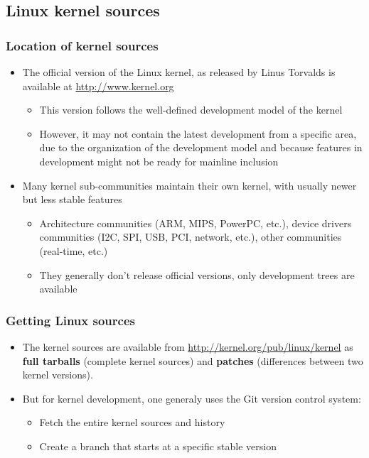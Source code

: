 \subsection{Linux kernel sources}

\begin{frame}
  \frametitle{Location of kernel sources}
  \begin{itemize}
  \item The official version of the Linux kernel, as released by Linus
    Torvalds is available at \url{http://www.kernel.org}
    \begin{itemize}
    \item This version follows the well-defined development model of
      the kernel
    \item However, it may not contain the latest development from a
      specific area, due to the organization of the development model
      and because features in development might not be ready for
      mainline inclusion
    \end{itemize}
  \item Many kernel sub-communities maintain their own kernel, with
    usually newer but less stable features
    \begin{itemize}
    \item Architecture communities (ARM, MIPS, PowerPC, etc.), device
      drivers communities (I2C, SPI, USB, PCI, network, etc.), other
      communities (real-time, etc.)
    \item They generally don't release official versions, only
      development trees are available
    \end{itemize}
  \end{itemize}
\end{frame}

\begin{frame}
  \frametitle{Getting Linux sources}
  \begin{itemize}

  \item The kernel sources are available from
    \url{http://kernel.org/pub/linux/kernel} as {\bf full tarballs}
    (complete kernel sources) and {\bf patches} (differences between
    two kernel versions).
  \item But for kernel development, one generaly uses the Git version
    control system:
    \begin{itemize}
    \item Fetch the entire kernel sources and history\\
    \item Create a branch that starts at a specific stable version\\
    \end{itemize}
  \end{itemize}
\end{frame}

